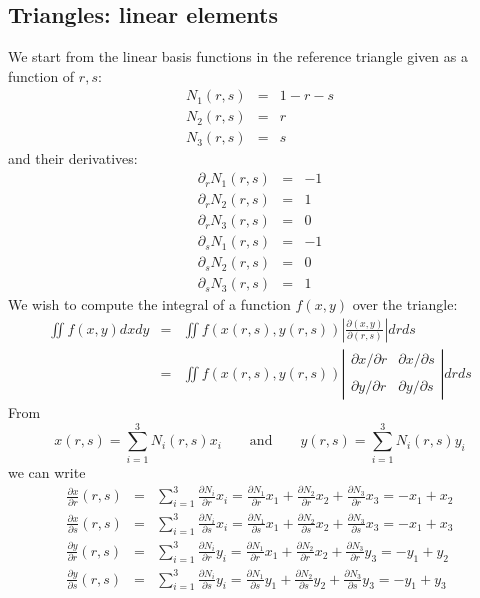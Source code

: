 \subsection{Triangles: linear elements} \label{ss:tle}

We start from the linear basis functions in the reference triangle given as a function of $r,s$:
\begin{eqnarray}
N_1(r,s) &=& 1-r-s \\
N_2(r,s) &=& r \\
N_3(r,s) &=& s
\end{eqnarray}
and their derivatives:
\begin{eqnarray}
\partial_r N_1(r,s) &=& -1 \\
\partial_r N_2(r,s) &=& 1 \\
\partial_r N_3(r,s) &=& 0 \\
\partial_s N_1(r,s) &=& -1 \\
\partial_s N_2(r,s) &=& 0\\
\partial_s N_3(r,s) &=& 1
\end{eqnarray}
We wish to compute the integral of a function $f(x,y)$ over the triangle:
\begin{eqnarray}
\iint f(x,y) dx dy 
&=& \iint f(x(r,s),y(r,s)) \left| \frac{\partial (x,y)}{\partial (r,s) } \right|  dr ds \\
&=& \iint f(x(r,s),y(r,s)) 
\left| 
\begin{array}{cc}
\partial x/\partial r & \partial x/\partial s \\ \\
\partial y/\partial r & \partial y/\partial s 
\end{array}
\right|  dr ds 
\end{eqnarray}
From 
\[
x(r,s)=\sum_{i=1}^3 N_i(r,s) x_i 
\qquad \text{and} \qquad 
y(r,s)=\sum_{i=1}^3 N_i(r,s) y_i 
\]
we can write
\begin{eqnarray}
\frac{\partial x}{\partial r}(r,s)
&=&\sum_{i=1}^3 \frac{\partial N_i}{\partial r} x_i
=\frac{\partial N_1}{\partial r} x_1+\frac{\partial N_2}{\partial r} x_2+\frac{\partial N_3}{\partial r} x_3
=- x_1+ x_2 \nonumber\\
\frac{\partial x}{\partial s}(r,s)
&=&\sum_{i=1}^3 \frac{\partial N_i}{\partial s} x_i
=\frac{\partial N_1}{\partial s} x_1+\frac{\partial N_2}{\partial s} x_2+\frac{\partial N_3}{\partial s} x_3
=- x_1+ x_3
\nonumber\\
\frac{\partial y}{\partial r}(r,s)
&=&\sum_{i=1}^3 \frac{\partial N_i}{\partial r} y_i
=\frac{\partial N_1}{\partial r} x_1+\frac{\partial N_2}{\partial r} x_2+\frac{\partial N_3}{\partial r} y_3
=- y_1+ y_2
\nonumber\\
\frac{\partial y}{\partial s}(r,s)
&=&\sum_{i=1}^3 \frac{\partial N_i}{\partial s} y_i
=\frac{\partial N_1}{\partial s} y_1+\frac{\partial N_2}{\partial s} y_2+\frac{\partial N_3}{\partial s} y_3
=- y_1+ y_3
\end{eqnarray}

